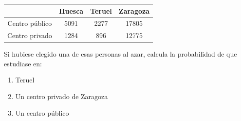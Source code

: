 \documentclass[fleqn]{article}
\begin{document}
\begin{enumerate}
\begin{tabular}{|c|c|c|c|}
\hline 
 & Huesca & Teruel & Zaragoza \\ 
\hline 
Centro público & 5091 & 2277 & 17805 \\ 
\hline 
Centro privado & 1284 & 896 & 12775 \\ 
\hline 
\end{tabular} 

Si hubiese elegido una de esas personas al azar, calcula la probabilidad de que estudiase en:
\begin{enumerate}
\item Teruel \noanswer
\item Un centro privado de Zaragoza \noanswer
\item Un centro público \noanswer
\end{enumerate}
 \end{enumerate}
\end{document}
